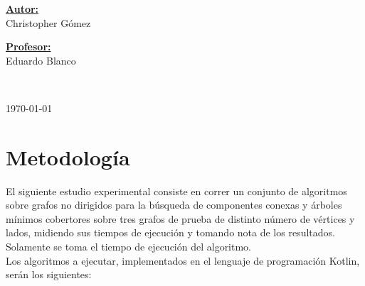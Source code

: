 \documentclass[11pt]{article}
\begin{document}
\begin{center}
   \begin{minipage}{\textwidth} 
      \begin{flushleft} \large    
         \textbf{\underline{Autor:}} \\ 
         Christopher Gómez \\
      \end{flushleft}
   \end{minipage}

   \begin{minipage}{\textwidth}    
      \vspace{-0.6cm}  
      \begin{flushright} \large    
         \textbf{\underline{Profesor:}} \\  
         Eduardo Blanco  
      \end{flushright}        
   \end{minipage} 

   \vspace*{1cm}
   \\
   \vspace{2cm}  

   \begin{center} 
      {\large \today} 
   \end{center}     
\end{center}                                                      
                                                               
\newpage
                                                    

\section{Metodología}

El siguiente estudio experimental consiste en correr un conjunto de algoritmos
sobre grafos no dirigidos para la búsqueda de componentes conexas y árboles mínimos
cobertores sobre tres grafos de prueba de distinto número de vértices y lados,
midiendo sus tiempos de ejecución y tomando nota de los resultados. \\

Solamente se toma el tiempo de ejecución del algoritmo. \\

Los algoritmos a ejecutar, implementados en el lenguaje de programación Kotlin,
serán los siguientes: 
\end{document}
